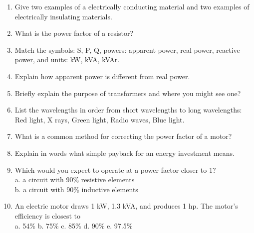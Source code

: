\documentclass[12pt, oneside]{article}
\begin{document}




\newpage
{}

\begin{enumerate}

\item Give two examples of a electrically conducting material and two
examples of electrically insulating materials.
\vfill
\item What is the power factor of a resistor?
\vfill
\item Match the symbols: S, P, Q, powers: apparent power, real power,
reactive power, and units: kW, kVA, kVAr.
\vfill
\item Explain how apparent power is different from real power.
\vfill
\item Briefly explain the purpose of transformers and where you might see one?
\vfill

\newpage
\item List the wavelengths in order from short wavelengths to long
wavelengths: Red light, X rays, Green light, Radio waves, Blue light.
\vfill
\item What is a common method for correcting the power factor of a motor?
\vfill
\item Explain in words what simple payback for an energy investment means.
\vfill
\item Which would you expect to operate at a power factor closer to 1?\\
a. a circuit with 90\% resistive elements\\
b. a circuit with 90\% inductive elements
\vfill
\item An electric motor draws 1 kW, 1.3 kVA, and produces 1 hp.  The
motor’s efficiency is closest to \\
a. 54\% \hfill
b. 75\% \hfill
c. 85\% \hfill
d. 90\% \hfill
e. 97.5\% \\
\vfill


\end{enumerate}
\end{document}
